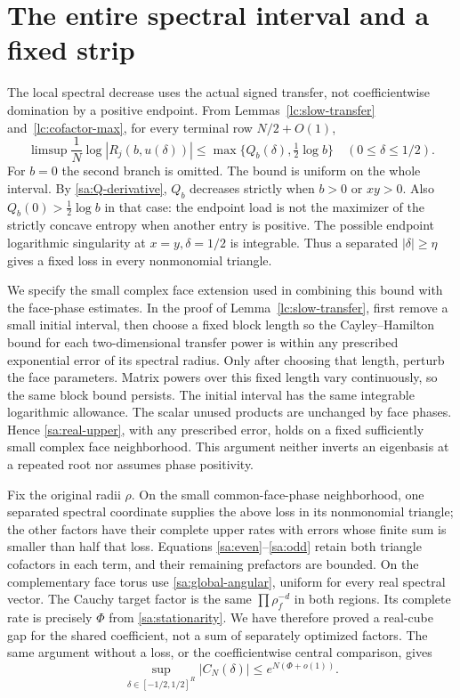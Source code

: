 \section{The entire spectral interval and a fixed strip}\label{sa:spectral}
The local spectral decrease uses the actual signed transfer, not
coefficientwise domination by a positive endpoint. From
Lemmas~\ref{lc:slow-transfer} and~\ref{lc:cofactor-max}, for every terminal row $N/2+O(1)$,
\begin{equation}\label{sa:real-upper}
 \limsup\frac1N\log|R_j(b,u(\delta))|
                  \le\max\{Q_b(\delta),\tfrac12\log b\}
                       \quad(0\le\delta\le1/2).
\end{equation}
For $b=0$ the second branch is omitted. The bound is uniform on the
whole interval. By \eqref{sa:Q-derivative}, $Q_b$ decreases strictly
when $b>0$ or $xy>0$. Also $Q_b(0)>\tfrac12\log b$ in that case:
the endpoint load is not the maximizer of the strictly concave entropy
when another entry is positive. The possible endpoint logarithmic
singularity at $x=y,\delta=1/2$ is integrable. Thus a separated
$|\delta|\ge\eta$ gives a fixed loss in every nonmonomial triangle.

We specify the small complex face extension used in combining this bound with the face-phase estimates.
In the proof of Lemma~\ref{lc:slow-transfer}, first remove a small initial
interval, then choose a fixed block length so the Cayley--Hamilton
bound for each two-dimensional transfer power is within any prescribed
exponential error of its spectral radius. Only after choosing that
length, perturb the face parameters. Matrix powers over this fixed
length vary continuously, so the same block bound persists. The
initial interval has the same integrable logarithmic allowance.
The scalar unused products are unchanged by face phases. Hence
\eqref{sa:real-upper}, with any prescribed error, holds on a fixed
sufficiently small complex face neighborhood. This argument neither
inverts an eigenbasis at a repeated root nor assumes phase positivity.

Fix the original radii $\rho$. On the small common-face-phase
neighborhood, one separated spectral coordinate supplies the above
loss in its nonmonomial triangle; the other factors have their
complete upper rates with errors whose finite sum is smaller than
half that loss. Equations \eqref{sa:even}--\eqref{sa:odd} retain both
triangle cofactors in each term, and their remaining prefactors are
bounded. On the complementary face torus use
\eqref{sa:global-angular}, uniform for every real spectral vector.
The Cauchy target factor is the same $\prod\rho_f^{-d}$ in both
regions. Its complete rate is precisely $\Phi$ from
\eqref{sa:stationarity}. We have therefore proved a real-cube gap
for the shared coefficient, not a sum of separately optimized factors.
The same argument without a loss, or the coefficientwise central
comparison, gives
\begin{equation}\label{sa:global-real}
 \sup_{\delta\in[-1/2,1/2]^R}|C_N(\delta)|
                                      \le e^{N(\Phi+o(1))}.
\end{equation}

